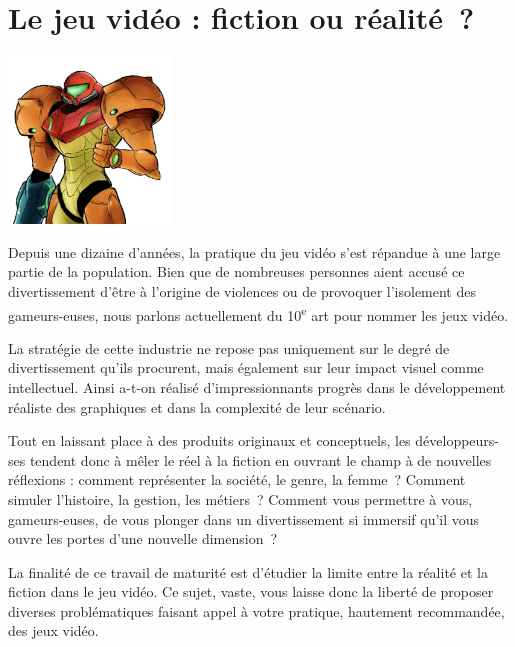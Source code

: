 \documentclass[
  10pt,
  french,
  a5paper,
  openany]{book}
\begin{document}
\hypertarget{le-jeu-viduxe9o-fiction-ou-ruxe9alituxe9}{%
\chapter{Le jeu vidéo : fiction ou réalité~?}\label{le-jeu-viduxe9o-fiction-ou-ruxe9alituxe9}}


\begin{center}
\includegraphics[width=\textwidth,height=12em]{images/le-jeu-video-fiction-ou-realite.jpg}

\end{center}


Depuis une dizaine d'années, la pratique du jeu vidéo s'est répandue à une large partie de la population. Bien que de nombreuses personnes aient accusé ce divertissement d'être à l'origine de violences ou de provoquer l'isolement des gameurs-euses, nous parlons actuellement du 10\textsuperscript{e} art pour nommer les jeux vidéo.

La stratégie de cette industrie ne repose pas uniquement sur le degré de divertissement qu'ils procurent, mais également sur leur impact visuel comme intellectuel. Ainsi a-t-on réalisé d'impressionnants progrès dans le développement réaliste des graphiques et dans la complexité de leur scénario.

Tout en laissant place à des produits originaux et conceptuels, les développeurs-ses tendent donc à mêler le réel à la fiction en ouvrant le champ à de nouvelles réflexions : comment représenter la société, le genre, la femme~? Comment simuler l'histoire, la gestion, les métiers~? Comment vous permettre à vous, gameurs-euses, de vous plonger dans un divertissement si immersif qu'il vous ouvre les portes d'une nouvelle dimension~?

\clearpage

La finalité de ce travail de maturité est d'étudier la limite entre la réalité et la fiction dans le jeu vidéo. Ce sujet, vaste, vous laisse donc la liberté de proposer diverses problématiques faisant appel à votre pratique, hautement recommandée, des jeux vidéo.
\end{document}
